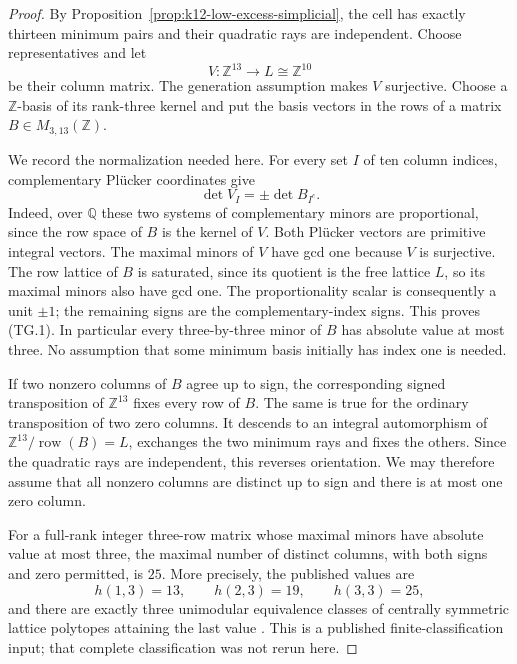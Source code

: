 \documentclass[11pt,a4paper]{article}
\theoremstyle{definition}
\begin{document}
\begin{proof}
By Proposition~\ref{prop:k12-low-excess-simplicial}, the cell has
exactly thirteen minimum pairs and their quadratic rays are
independent. Choose representatives and let
\[
 V:\mathbb Z^{13}\longrightarrow L\cong\mathbb Z^{10}
\]
be their column matrix. The generation assumption makes $V$
surjective. Choose a $\mathbb Z$-basis of its rank-three kernel
and put the basis vectors in the rows of a matrix
$B\in M_{3,13}(\mathbb Z)$.

We record the normalization needed here. For every set $I$ of
ten column indices, complementary Pl\"ucker coordinates give
\[
       \det V_I=\pm\det B_{I^c}.                         \tag{TG.1}
\]
Indeed, over $\mathbb Q$ these two systems of complementary
minors are proportional, since the row space of $B$ is the
kernel of $V$. Both Pl\"ucker vectors are primitive integral
vectors. The maximal minors of $V$ have gcd one because $V$
is surjective. The row lattice of $B$ is saturated, since its
quotient is the free lattice $L$, so its maximal minors also
have gcd one. The proportionality scalar is consequently a
unit $\pm1$; the remaining signs are the complementary-index
signs. This proves (TG.1). In particular every three-by-three
minor of $B$ has absolute value at most three. No assumption
that some minimum basis initially has index one is needed.

If two nonzero columns of $B$ agree up to sign, the corresponding
signed transposition of $\mathbb Z^{13}$ fixes every row of $B$.
The same is true for the ordinary transposition of two zero
columns. It descends to an integral automorphism of
$\mathbb Z^{13}/\operatorname{row}(B)=L$, exchanges the two
minimum rays and fixes the others. Since the quadratic rays
are independent, this reverses orientation. We may therefore
assume that all nonzero columns are distinct up to sign and
there is at most one zero column.

For a full-rank integer three-row matrix whose maximal minors
have absolute value at most three, the maximal number of
distinct columns, with both signs and zero permitted, is
$25$. More precisely, the published values are
\[
 h(1,3)=13,\qquad h(2,3)=19,\qquad h(3,3)=25,
\]
and there are exactly three unimodular equivalence classes of
centrally symmetric lattice polytopes attaining the last value
\cite[\S\S5.1--5.2, Tables~1 and~3, p.~85]{AverkovSchymura2024}.
This is a published finite-classification input; that complete
classification was not rerun here.


\end{proof}
\end{document}
